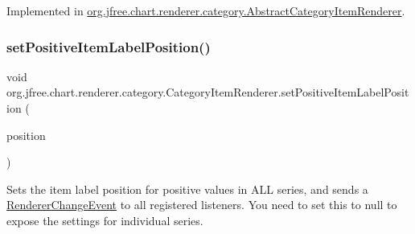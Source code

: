 Implemented in \mbox{\hyperlink{classorg_1_1jfree_1_1chart_1_1renderer_1_1category_1_1_abstract_category_item_renderer_ace23a8e40019e23cde2ff8e729bb36a0}{org.\+jfree.\+chart.\+renderer.\+category.\+Abstract\+Category\+Item\+Renderer}}.

\mbox{\label{interfaceorg_1_1jfree_1_1chart_1_1renderer_1_1category_1_1_category_item_renderer_a5c8f5ce5838f1665ccea46f50e507c0d}} 
\subsubsection{\texorpdfstring{set\+Positive\+Item\+Label\+Position()}{setPositiveItemLabelPosition()}\hspace{0.1cm}{\footnotesize\ttfamily [1/2]}}
{\footnotesize\ttfamily void org.\+jfree.\+chart.\+renderer.\+category.\+Category\+Item\+Renderer.\+set\+Positive\+Item\+Label\+Position (\begin{DoxyParamCaption}\item[{\mbox{\hyperlink{classorg_1_1jfree_1_1chart_1_1labels_1_1_item_label_position}{Item\+Label\+Position}}}]{position }\end{DoxyParamCaption})}

Sets the item label position for positive values in A\+LL series, and sends a \mbox{\hyperlink{}{Renderer\+Change\+Event}} to all registered listeners. You need to set this to {\ttfamily null} to expose the settings for individual series.



